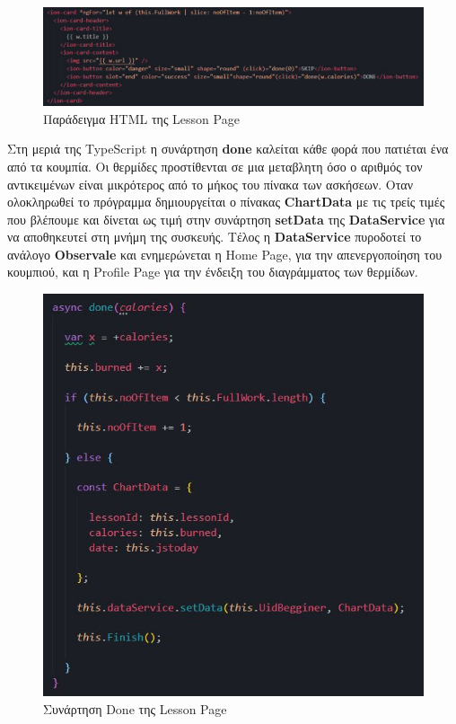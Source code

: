 \documentclass[a4paper,12pt]{article}
\begin{document}
			\begin{figure}[!htb]
				\begin{center}
					\caption{Παράδειγμα HTML της Lesson Page}
					\vspace*{0.5cm}
					\includegraphics[width=.9\linewidth]{doneHtml} 
				\end{center}  	
			\end{figure}

			\newpage
			Στη μεριά της TypeScript η συνάρτηση \textbf{done} καλείται κάθε φορά που πατιέται ένα από τα κουμπία.
			Οι θερμίδες προστίθενται σε μια μεταβλητη όσο ο αριθμός τον αντικειμένων είναι μικρότερος από το μήκος του
			πίνακα των ασκήσεων. Οταν ολοκληρωθεί το πρόγραμμα δημιουργείται ο πίνακας \textbf{ChartData}
			με τις τρείς τιμές που βλέπουμε και δίνεται ως τιμή στην συνάρτηση \textbf{setData} της \textbf{DataService} για να αποθηκευτεί
			στη μνήμη της συσκευής. Τέλος η \textbf{DataService} πυροδοτεί το ανάλογο \textbf{Observale} και ενημερώνεται η Home Page, για την απενεργοποίηση του κουμπιού, και
			η Profile Page για την ένδειξη του διαγράμματος των θερμίδων.
			\vspace{.5cm}

			\begin{figure}[!htb]
				\begin{center}
					\caption{Συνάρτηση Done της Lesson Page}
					\vspace*{0.5cm}
					\includegraphics[width=.9\linewidth]{doneTS} 
				\end{center}
			\end{figure}
\end{document}

